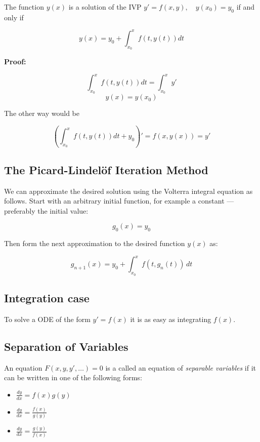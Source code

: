The function \(y(x)\) is a solution of the IVP \(y' = f(x,y),\quad y(x_0) = y_0\) if and only if

\[
    y(x) = y_0 + \int_{x_0}^{x} f(t, y(t))dt
\]

\textbf{Proof:}

\[
    \int_{x_0}^{x} f(t, y(t))dt = \int_{x_0}^{x} y'
\]
\[
    y(x) = y(x_0)
\]

The other way would be

\[
    \left(\int_{x_0}^{x} f(t, y(t))dt + y_0\right)' = f(x, y(x)) = y' 
\]

\QED

\subsection{The Picard-Lindelöf Iteration Method}

We can approximate the desired solution using the Volterra integral equation as follows. 
Start with an arbitrary initial function, for example a constant — preferably the initial value:

\[
    g_0(x) = y_0
\]

Then form the next approximation to the desired function \( y(x) \) as:

\[
    g_{n+1}(x) = y_0 + \int_{x_0}^{x} f(t, g_n(t)) \, dt
\]

\subsection{Integration case}

To solve a ODE of the form \(y' = f(x)\) it is as easy as integrating \(f(x)\).

\subsection{Separation of Variables}

An equation \(F(x,y,y',\dots) = 0\) is a called an equation of \emph{separable variables} if it can
be written in one of the following forms:

\begin{itemize}
    
    \item \(\frac{dy}{dx} = f(x) g(y)\)
    
    \item \(\frac{dy}{dx} = \frac{f(x)}{g(y)}\)
    
    \item \(\frac{dy}{dx} = \frac{g(y)}{f(x)}\)

\end{itemize}

